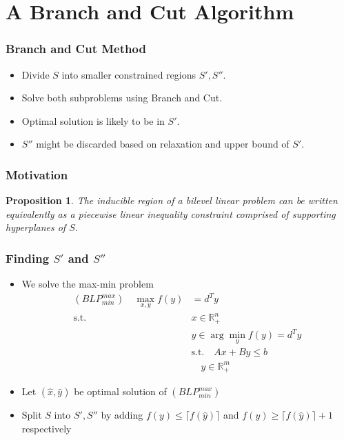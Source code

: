 \documentclass[11pt]{beamer}
\newtheorem{theo}{Proposition}
\begin{document}
\section{A Branch and Cut Algorithm}
\begin{frame}
	\frametitle{Branch and Cut Method}
	\begin{itemize}
		\item Divide $S$ into smaller constrained regions $S', S''$.
		\item Solve both subproblems using Branch and Cut.
		\item Optimal solution is likely to be in $S'$. 
		\item $S''$ might be discarded based on relaxation and upper bound of $S'$.
	\end{itemize}
\end{frame}

\begin{frame}
	\frametitle{Motivation}
	\begin{theo}
		The inducible region of a bilevel linear problem can be written equivalently as a piecewise linear inequality constraint comprised of supporting hyperplanes of $S$.
	\end{theo}
	
	
\end{frame}

\begin{frame}
	\frametitle{Finding $S'$ and $S''$}
	\begin{itemize}
	\item We solve the max-min problem
		\begin{align*}
			(BLP^{max}_{min}) \quad \max_{x,y} f(y) &= d^T y \\
			\text{s.t.} \quad &x \in \mathbb{R}^n_{+} \\
			&y \in \arg \min_{y} f(y) = d^Ty \\
			&\text{s.t.} \quad Ax + By \le b \\
			& \quad y \in \mathbb{R}^m_{+}
		\end{align*}
		\item Let $(\hat x, \hat y)$ be optimal solution of $(BLP^{max}_{min})$
		\item Split $S$ into $S', S''$ by adding $f(y) \le \lceil f(\hat y) \rceil$ and $f(y) \ge \lceil f(\hat y) \rceil + 1$ respectively
	\end{itemize}
\end{frame}
\end{document}
